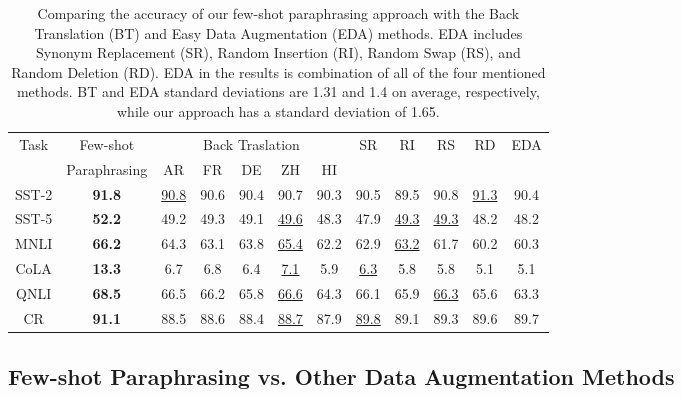 \documentclass[11pt]{article}
\begin{document}
\begin{table*}[]
    \centering
\begin{tabular}{c|c|ccccc|ccccc}
    \hline
        \multirow{2}{*}{Task} & Few-shot     & \multicolumn{5}{c|}{Back Traslation} & \multirow{2}{*}{SR} & \multirow{2}{*}{RI} & \multirow{2}{*}{RS} & \multirow{2}{*}{RD} & \multirow{2}{*}{EDA} \\
                              & Paraphrasing & AR    & FR    & DE    & ZH   & HI & &      &      &      &      \\ \hline
        SST-2                 & \textbf{91.8}         & \underline{90.8}  & 90.6  & 90.4  & 90.7 & 90.3 & 90.5 & 89.5 & 90.8 & \underline{91.3} & 90.4 \\
        SST-5                 & \textbf{52.2}         & 49.2  & 49.3  & 49.1  & \underline{49.6} & 48.3 & 47.9 & \underline{49.3} & \underline{49.3} & 48.2 & 48.2 \\
        MNLI                  & \textbf{66.2}         & 64.3  & 63.1  & 63.8  & \underline{65.4} & 62.2 & 62.9 & \underline{63.2} & 61.7 & 60.2 & 60.3 \\
        CoLA                  & \textbf{13.3}         & 6.7   & 6.8   & 6.4   & \underline{7.1}  & 5.9  & \underline{6.3}  & 5.8  & 5.8  & 5.1  & 5.1  \\
        QNLI                  & \textbf{68.5}         & 66.5  & 66.2  & 65.8  & \underline{66.6} & 64.3 & 66.1 & 65.9 & \underline{66.3} & 65.6 & 63.3 \\
        CR                    & \textbf{91.1}         & 88.5  & 88.6  & 88.4  & \underline{88.7} & 87.9 & \underline{89.8} & 89.1 & 89.3 & 89.6 & 89.7 \\ \hline
    \end{tabular}
    \caption{\label{table:ParaphrasingVTranslation} Comparing the accuracy of our few-shot paraphrasing approach with the Back Translation (BT) and Easy Data Augmentation (EDA) methods. EDA includes Synonym Replacement (SR), Random Insertion (RI), Random Swap (RS), and Random Deletion (RD). EDA in the results is combination of all of the four mentioned methods. BT and EDA standard deviations are 1.31 and 1.4 on average, respectively, while our approach has a standard deviation of 1.65.}
\end{table*}

\subsection{Few-shot Paraphrasing vs. Other Data Augmentation Methods}
\label{subsec:ParaphrasingVTranslation}
\end{document}
